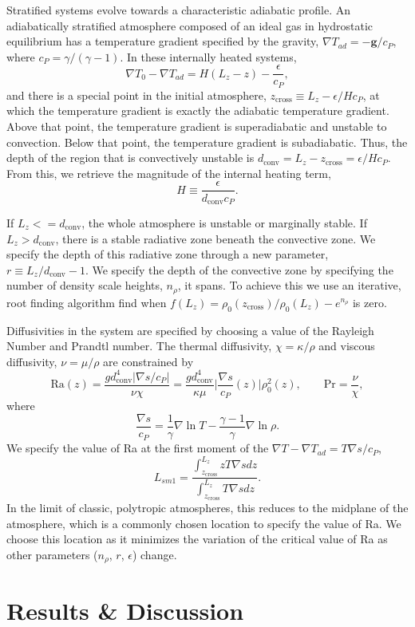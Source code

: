 \documentclass[aps, pre, onecolumn, nofootinbib, notitlepage, groupedaddress, amsfonts, amssymb, amsmath, longbibliography]{revtex4-1}
\newcommand{\grad}{\ensuremath{\nabla}}
\begin{document}
Stratified systems evolve towards a characteristic adiabatic profile.  An adiabatically
stratified atmosphere composed of an ideal gas in hydrostatic equilibrium has a
temperature gradient specified by the gravity, $\grad T_{ad} = -\bm{g} / c_P$, where
$c_P = \gamma/(\gamma-1)$.  In these internally heated systems,
\begin{equation}
\grad T_0 - \grad T_{ad} = H(L_z - z) - \frac{\epsilon}{c_P},
\end{equation}
and there is a special point in the initial atmosphere, $z_{\text{cross}} \equiv L_z - \epsilon / H c_P$,
at which the temperature gradient is exactly the adiabatic temperature gradient.  Above that point,
the temperature gradient is superadiabatic and unstable to convection.  Below that point,
the temperature gradient is subadiabatic.  Thus, the depth of the region that is convectively
unstable is $d_{\text{conv}} = L_z - z_{\text{cross}} = \epsilon / H c_P$.  From this,
we retrieve the magnitude of the internal heating term,
\begin{equation}
H \equiv \frac{\epsilon}{d_{\text{conv}} c_P}.
\end{equation}

If $L_z <= d_{\text{conv}}$, the whole atmosphere is unstable or marginally stable.
If $L_z > d_{\text{conv}}$, there is a stable radiative zone beneath the convective
zone.  We specify the depth of this radiative zone through a new parameter,
$r \equiv L_z/d_{\text{conv}} - 1$.  We specify the depth of the convective zone by
specifying the number of density scale heights, $n_\rho$, it spans.  To achieve this we
use an iterative, root finding algorithm find when
$f(L_z) = \rho_0(z_{\text{cross}})/\rho_0(L_z) -  e^{n_\rho}$ is zero.

Diffusivities in the system are specified by choosing a value of the Rayleigh
Number and Prandtl number.  The thermal diffusivity, $\chi = \kappa / \rho$ and
viscous diffusivity, $\nu = \mu / \rho$ are constrained by
\begin{equation}
\text{Ra}(z) = \frac{g d_{\text{conv}}^4 \bigg|\grad s / c_P\bigg|}{\nu\chi} = 
\frac{g d_{\text{conv}}^4}{\kappa\mu}\bigg|\frac{\grad s}{c_P}(z)\bigg|\rho_0^2(z),\qquad
\text{Pr} = \frac{\nu}{\chi},
\end{equation}
where 
\begin{equation}
\frac{\grad s}{c_P} = \frac{1}{\gamma} \grad\ln T - \frac{\gamma-1}{\gamma} \grad \ln \rho.
\end{equation}
We specify the value of Ra at the first moment of the $\grad T - \grad T_{ad} = T \grad s / c_P$,
\begin{equation}
L_{sm1} = \frac{\int_{z_{\text{cross}}}^{L_z} z T\grad s dz}{\int_{z_{\text{cross}}}^{L_z} T\grad s dz}.
\end{equation}
In the limit of classic, polytropic atmospheres, this reduces to the midplane of the atmosphere,
which is a commonly chosen location to specify the value of Ra.  We choose this location as it
minimizes the variation of the critical value of Ra as other parameters ($n_\rho$, $r$, $\epsilon$)
change.


\section{Results \& Discussion}
\label{sec:results}


\end{document}
